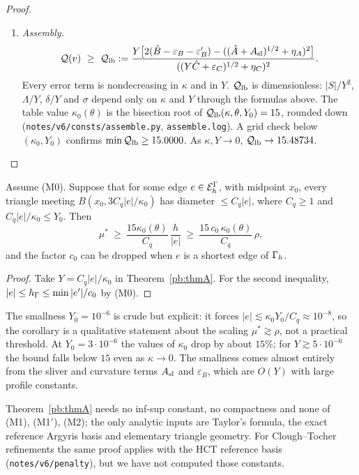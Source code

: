 \begin{proof}
\begin{enumerate}[label=\arabic*.]
using $B(v)-B(w)=\ip{\dn(v-w)}v+\ip{\dn w}{v-w}$.
\item \emph{Assembly.}
\[\mathcal Q(v)\ \ge\ \mathcal Q_{\rm lb}:=\frac{Y\bigl[2(\hat B-\varepsilon_B-\varepsilon_B')-((\hat A+A_{\rm sl})^{1/2}+\eta_A)^2\bigr]}{((Y\hat C+\varepsilon_C)^{1/2}+\eta_C)^2}.\]
Every error term is nondecreasing in $\kappa$ and in $Y$. $\mathcal Q_{\rm lb}$ is dimensionless: $|S|/Y^2$, $\Lambda/Y$,
$\delta/Y$ and $\sigma$ depend only on $\kappa$ and $Y$ through the formulas above. The table value $\kappa_0(\theta)$ is the
bisection root of $\mathcal Q_{\rm lb}(\kappa,\theta,Y_0)=15$, rounded down (\texttt{notes/v6/consts/assemble.py}, \texttt{assemble.log}). A
grid check below $(\kappa_0,Y_0)$ confirms $\min\mathcal Q_{\rm lb}\ge15.0000$. As $\kappa,Y\to0$, $\mathcal Q_{\rm lb}\to15.48734$.\qedhere
\end{enumerate}
\end{proof}

\begin{corollary}\label{pb:corA}
Assume (M0). Suppose that for some edge $e\in\mathcal E_h^\Gamma$, with midpoint $x_0$, every triangle meeting $B(x_0,3C_q|e|/\kappa_0)$ has
diameter $\le C_q|e|$, where $C_q\ge1$ and $C_q|e|/\kappa_0\le Y_0$. Then
\[\mu^\ast\ \ge\ \frac{15\kappa_0(\theta)}{C_q}\,\frac h{|e|}\ \ge\ \frac{15\,c_0\,\kappa_0(\theta)}{C_q}\,\rho ,\]
and the factor $c_0$ can be dropped when $e$ is a shortest edge of $\Gamma_h$.
\end{corollary}
\begin{proof}
Take $Y=C_q|e|/\kappa_0$ in Theorem~\ref{pb:thmA}. For the second inequality, $|e|\le h_\Gamma\le\min|e'|/c_0$ by (M0).
\end{proof}
The smallness $Y_0=10^{-6}$ is crude but explicit: it forces $|e|\lesssim\kappa_0Y_0/C_q\approx10^{-8}$, so the corollary is a qualitative statement about the scaling $\mu^\ast\gtrsim\rho$, not a practical threshold. At $Y_0=3\cdot10^{-6}$ the values of $\kappa_0$ drop by about $15\%$; for $Y\gtrsim5\cdot10^{-6}$ the bound falls below $15$ even as $\kappa\to0$. The smallness comes almost entirely from the sliver and curvature terms $A_{\rm sl}$ and $\varepsilon_B$, which are $O(Y)$ with large profile constants.

Theorem~\ref{pb:thmA} needs no inf-sup constant, no compactness and none of (M1), (M1$'$), (M2); the only analytic inputs are Taylor's formula, the exact reference Argyris basis and elementary triangle geometry. For Clough--Tocher refinements the same proof applies with the HCT reference basis (\texttt{notes/v6/penalty}), but we have not computed those constants.

